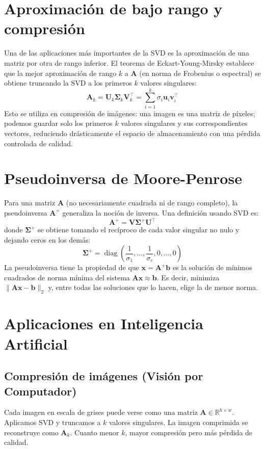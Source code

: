\documentclass[12pt,a4paper,openany,oneside]{book}
\begin{document}
\section{Aproximación de bajo rango y compresión}

Una de las aplicaciones más importantes de la SVD es la aproximación de una matriz por otra de rango inferior. El teorema de Eckart-Young-Mirsky establece que la mejor aproximación de rango $k$ a $\mathbf{A}$ (en norma de Frobenius o espectral) se obtiene truncando la SVD a los primeros $k$ valores singulares:
\[
\mathbf{A}_k = \mathbf{U}_k \boldsymbol{\Sigma}_k \mathbf{V}_k^\top = \sum_{i=1}^k \sigma_i \mathbf{u}_i \mathbf{v}_i^\top
\]
Esto se utiliza en compresión de imágenes: una imagen es una matriz de píxeles; podemos guardar solo los primeros $k$ valores singulares y sus correspondientes vectores, reduciendo drásticamente el espacio de almacenamiento con una pérdida controlada de calidad.

\section{Pseudoinversa de Moore-Penrose}

Para una matriz $\mathbf{A}$ (no necesariamente cuadrada ni de rango completo), la pseudoinversa $\mathbf{A}^+$ generaliza la noción de inversa. Una definición usando SVD es:
\[
\mathbf{A}^+ = \mathbf{V} \boldsymbol{\Sigma}^+ \mathbf{U}^\top
\]
donde $\boldsymbol{\Sigma}^+$ se obtiene tomando el recíproco de cada valor singular no nulo y dejando ceros en los demás:
\[
\boldsymbol{\Sigma}^+ = \operatorname{diag}\left(\frac{1}{\sigma_1}, \dots, \frac{1}{\sigma_r}, 0, \dots, 0\right)
\]
La pseudoinversa tiene la propiedad de que $\mathbf{x} = \mathbf{A}^+ \mathbf{b}$ es la solución de mínimos cuadrados de norma mínima del sistema $\mathbf{A}\mathbf{x} \approx \mathbf{b}$. Es decir, minimiza $\|\mathbf{A}\mathbf{x} - \mathbf{b}\|_2$ y, entre todas las soluciones que lo hacen, elige la de menor norma.

\section{Aplicaciones en Inteligencia Artificial}

\subsection{Compresión de imágenes (Visión por Computador)}
Cada imagen en escala de grises puede verse como una matriz $\mathbf{A} \in \mathbb{R}^{h \times w}$. Aplicamos SVD y truncamos a $k$ valores singulares. La imagen comprimida se reconstruye como $\mathbf{A}_k$. Cuanto menor $k$, mayor compresión pero más pérdida de calidad.
\end{document}
